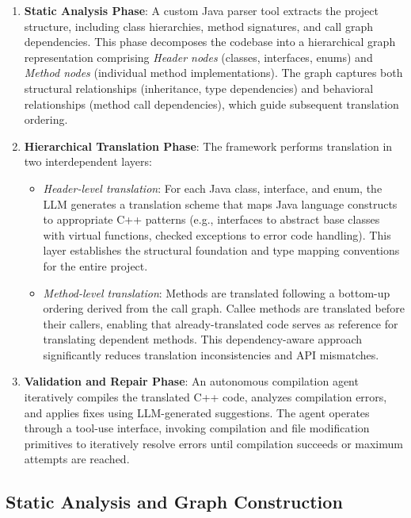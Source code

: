\begin{enumerate}
\item \textbf{Static Analysis Phase}: A custom Java parser tool extracts the project structure, including class hierarchies, method signatures, and call graph dependencies. This phase decomposes the codebase into a hierarchical graph representation comprising \emph{Header nodes} (classes, interfaces, enums) and \emph{Method nodes} (individual method implementations). The graph captures both structural relationships (inheritance, type dependencies) and behavioral relationships (method call dependencies), which guide subsequent translation ordering.

\item \textbf{Hierarchical Translation Phase}: The framework performs translation in two interdependent layers:
\begin{itemize}
\item \textit{Header-level translation}: For each Java class, interface, and enum, the LLM generates a translation scheme that maps Java language constructs to appropriate C++ patterns (e.g., interfaces to abstract base classes with virtual functions, checked exceptions to error code handling). This layer establishes the structural foundation and type mapping conventions for the entire project.
\item \textit{Method-level translation}: Methods are translated following a bottom-up ordering derived from the call graph. Callee methods are translated before their callers, enabling that already-translated code serves as reference for translating dependent methods. This dependency-aware approach significantly reduces translation inconsistencies and API mismatches.
\end{itemize}

\item \textbf{Validation and Repair Phase}: An autonomous compilation agent iteratively compiles the translated C++ code, analyzes compilation errors, and applies fixes using LLM-generated suggestions. The agent operates through a tool-use interface, invoking compilation and file modification primitives to iteratively resolve errors until compilation succeeds or maximum attempts are reached.
\end{enumerate}

\subsection{Static Analysis and Graph Construction}

